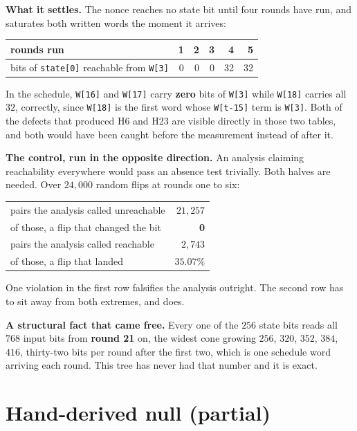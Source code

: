 \textbf{What it settles.} The nonce reaches no state bit until four rounds have run, and saturates both written words the moment it arrives:

\begin{center}
\begin{tabular}{@{}lrrrrr@{}}
\toprule
rounds run & 1 & 2 & 3 & 4 & 5 \\
\midrule
bits of \texttt{state[0]} reachable from \texttt{W[3]} & 0 & 0 & 0 & 32 & 32 \\
\bottomrule
\end{tabular}
\end{center}

In the schedule, \texttt{W[16]} and \texttt{W[17]} carry \textbf{zero} bits of \texttt{W[3]} while \texttt{W[18]} carries all \(32\), correctly, since \texttt{W[18]} is the first word whose \texttt{W[t-15]} term is \texttt{W[3]}. Both of the defects that produced H6 and H23 are visible directly in those two tables, and both would have been caught before the measurement instead of after it.

\textbf{The control, run in the opposite direction.} An analysis claiming reachability everywhere would pass an absence test trivially. Both halves are needed. Over \(24{,}000\) random flips at rounds one to six:

\begin{center}
\begin{tabular}{@{}lr@{}}
\toprule
pairs the analysis called unreachable & \(21{,}257\) \\
of those, a flip that changed the bit & \textbf{0} \\
pairs the analysis called reachable & \(2{,}743\) \\
of those, a flip that landed & \(35.07\%\) \\
\bottomrule
\end{tabular}
\end{center}

One violation in the first row falsifies the analysis outright. The second row has to sit away from both extremes, and does.

\textbf{A structural fact that came free.} Every one of the \(256\) state bits reads all \(768\) input bits from \textbf{round 21} on, the widest cone growing \(256\), \(320\), \(352\), \(384\), \(416\), thirty-two bits per round after the first two, which is one schedule word arriving each round. This tree has never had that number and it is exact.

\section{Hand-derived null (partial)}

